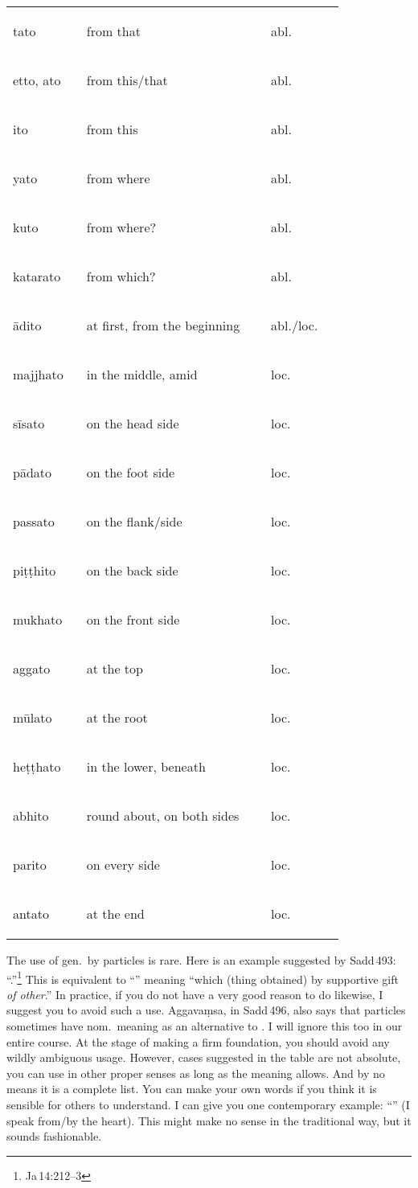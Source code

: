 \begin{longtable}[c]{@{}%
	>{\itshape\raggedright\arraybackslash}p{0.2\linewidth}%
	>{\raggedright\arraybackslash}p{0.5\linewidth}%
	>{\raggedright\arraybackslash}p{0.2\linewidth}@{}}
tato & from that & abl. \\
etto, ato & from this/that & abl. \\
ito & from this & abl. \\
yato & from where & abl. \\
kuto & from where? & abl. \\
katarato & from which? & abl. \\
\=adito & at first, from the beginning & abl./loc. \\
majjhato & in the middle, amid & loc. \\
s\=isato & on the head side & loc. \\
p\=adato & on the foot side & loc. \\
passato & on the flank/side & loc. \\
pi\d t\d thito & on the back side & loc. \\
mukhato & on the front side & loc. \\
aggato & at the top & loc. \\
m\=ulato & at the root & loc. \\
he\d t\d thato & in the lower, beneath & loc. \\
abhito & round about, on both sides & loc. \\
parito & on every side & loc. \\
antato & at the end & loc. \\
\end{longtable}

The use of gen.\ by  particles is rare. Here is an example suggested by Sadd\,493: ``.''\footnote{Ja\,14:212--3} This is equivalent to ``'' meaning ``which (thing obtained) by supportive gift \emph{of other}.'' In practice, if you do not have a very good reason to do likewise, I suggest you to avoid such a use. Aggava\d msa, in Sadd\,496, also says that  particles sometimes have nom.\ meaning as an alternative to . I will ignore this too in our entire course. At the stage of making a firm foundation, you should avoid any wildly ambiguous usage. However, cases suggested in the table are not absolute, you can use in other proper senses as long as the meaning allows. And by no means it is a complete list. You can make your own words if you think it is sensible for others to understand. I can give you one contemporary example: ``'' (I speak from/by the heart). This might make no sense in the traditional way, but it sounds fashionable.

